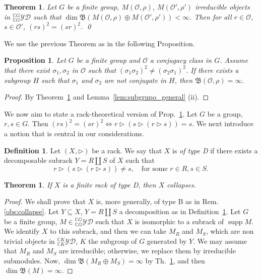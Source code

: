 \documentclass[11pt]{amsart} \textheight 22cm
\newcommand{\supp}{\operatorname{supp}}
\renewcommand{\^}[1]{\mbox{$^{\left( #1 \right)}$}}
\renewcommand{\_}[1]{\mbox{$_{\left( #1 \right)}$}}
\newcommand\toba{{\mathfrak B }}
\newcommand{\trid}{\triangleright}
\newcommand{\ku}{\mathbb C}
\newcommand{\Oc}{{\mathcal O}}
\newcommand{\oc}{{\mathcal O}}
\newcommand{\ydg}{{}^{\ku G}_{\ku G}\mathcal{YD}}
\newcommand{\ydk}{{}^{\ku K}_{\ku K}\mathcal{YD}}
\theoremstyle{plain}
\newtheorem{theorem}[lema]{Theorem}
\newtheorem{prop}[lema]{Proposition}
\theoremstyle{definition}
\newtheorem{definition}[lema]{Definition}
\theoremstyle{remark}
\theoremstyle{remark}
\begin{document}
\begin{theorem}\label{thm:hs} \cite[Th. 8.6 (1)]{HS1}
    Let $G$ be a finite group, $M(\Oc, \rho)$, $M(\Oc', \rho')$ irreducible objects in
    $\ydg$ such that $\dim \toba(M(\Oc, \rho)\oplus M(\Oc', \rho')) <\infty$. Then
    for all $r\in \oc$, $s\in \oc'$, $(rs)^2 = (sr)^2$. \qed
\end{theorem}

We use the previous Theorem as in the following Proposition.
\begin{prop}\label{pr:lamejortec}
    Let $G$ be a finite group and $\mathcal{O}$ a conjugacy class in $G$.  Assume that there
    exist $\sigma_1,\sigma_2$ in $\mathcal{O}$ such that
    $(\sigma_1\sigma_2)^2\ne(\sigma_2\sigma_1)^2$. If there exists a subgroup $H$ such that
    $\sigma_1$ and $\sigma_2$ are not conjugate in $H$, then
    $\mathfrak{B}(\mathcal{O},\rho)=\infty$.
\end{prop}
\begin{proof}
    By Theorem~\ref{thm:hs} and Lemma~\ref{lem:subgrupo_general} (ii).
\end{proof}

We now aim to state a rack-theoretical version of
Prop.~\ref{pr:lamejortec}. Let $G$ be a group, $r,s\in G$. Then
$(rs)^2=(sr)^2 \iff r\trid(s\trid(r\trid s))=s$. We next introduce
a notion that is central in our considerations.

\begin{definition}\label{def:tipod}
    Let $(X, \trid)$ be a rack. We say that $X$ is \emph{of type D} if there exists  a
    decomposable subrack $Y = R\coprod S$ of $X$ such that
    \begin{equation}\label{eqn:hypothesis-subrack}
        r\trid(s\trid(r\trid s)) \neq s, \quad \text{for some } r\in R, s\in S.
    \end{equation}
\end{definition}



\begin{theorem}\label{th:racks-claseD}
    If $X$ is a finite rack of type D, then $X$  collapses.
\end{theorem}
\begin{proof}
    We shall prove that $X$ is, more generally, of type B as in
    Rem. \ref{obs:collapse}.  Let $Y\subseteq X$, $Y=R\coprod S$ a decomposition as in
    Definition~\ref{def:tipod}.  Let $G$ be a finite group, $M\in\ydg$ such that $X$ is
    isomorphic to a subrack of $\supp M$. We identify $X$ to this subrack, and then we can
    take $M_R$ and $M_S$, which are non trivial objects in $\ydk$, $K$ the subgroup of $G$
    generated by $Y$. We may assume that $M_R$ and $M_S$ are irreducible; otherwise, we
    replace them by irreducible submodules.  Now, $\dim\toba(M_R\oplus M_S) = \infty$
    by Th.~\ref{thm:hs}, and then $\dim\toba(M) = \infty$.
\end{proof}
\end{document}
